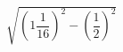 \begin{ex}[type=calculate]
	\begin{condition}
		\( \sqrt{\left( 1\dfrac{1}{16} \right)^2-\left( \dfrac{1}{2} \right)^2} \)
	\end{condition}
\end{ex}